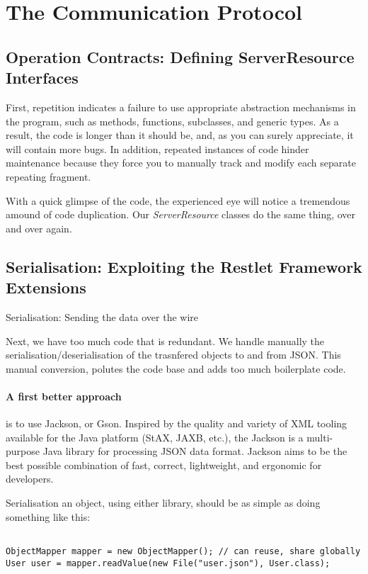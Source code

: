\documentclass[12pt]{scrartcl}
\begin{document}
\section{The Communication Protocol}

\subsection{Operation Contracts: Defining ServerResource Interfaces} 

First, repetition indicates a failure to use appropriate abstraction mechanisms in the program, such as methods, functions, subclasses, and generic types. As a result, the code is longer than it should be, and, as you can surely appreciate, it will contain more bugs. In addition, repeated instances of code hinder maintenance because they force you to manually track and modify each separate repeating fragment. \cite{Spinellis:2006:CQO:1197266}

With a quick glimpse of the code, the experienced eye will notice a tremendous amound of code duplication. Our \emph{ServerResource} classes do the same thing, over and over again.

\subsection{Serialisation: Exploiting the Restlet Framework Extensions} 

Serialisation: Sending the data over the wire

Next, we have too much code that is redundant. We handle manually the serialisation/deserialisation of the trasnfered objects to and from JSON. This manual conversion, polutes the code base and adds too much boilerplate code. 

\paragraph{A first better approach} is to use Jackson, or Gson. Inspired by the quality and variety of XML tooling available for the Java platform (StAX, JAXB, etc.), the Jackson is a multi-purpose Java library for processing JSON data format. Jackson aims to be the best possible combination of fast, correct, lightweight, and ergonomic for developers.

Serialisation an object, using either library, should be as simple as doing something like this:

\begin{lstlisting}

ObjectMapper mapper = new ObjectMapper(); // can reuse, share globally
User user = mapper.readValue(new File("user.json"), User.class);

\end{lstlisting}
\end{document}

